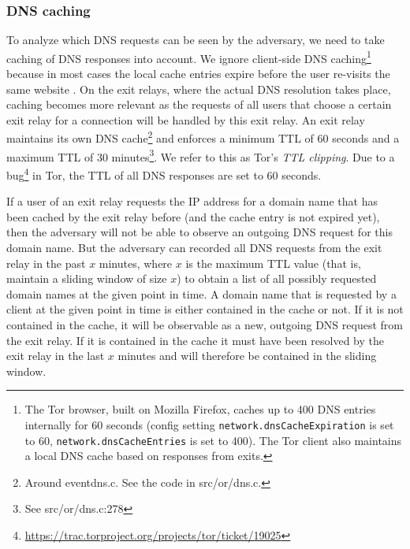 \subsubsection{DNS caching}
To analyze which DNS requests can be seen by the adversary, we need to
take caching of DNS responses into account. We ignore client-side DNS
caching\footnote{The Tor browser, built on Mozilla Firefox, caches up to
		400 DNS entries internally for 60 seconds (config setting
		\texttt{network.dnsCacheExpiration} is set to 60,
		\texttt{network.dnsCacheEntries} is set to 400). The Tor client
		also maintains a local DNS cache based on responses from exits.
			}
because in most cases the local cache entries expire before the user
re-visits the same website .
On the exit relays, where the actual DNS resolution takes place, caching
becomes more relevant as the requests of all users that choose a certain
exit relay for a connection will be handled by this exit relay. An exit
relay maintains its own DNS cache\footnote{Around eventdns.c.  See the
		code in src/or/dns.c.} and enforces a minimum TTL of 60 seconds
and a maximum TTL of 30 minutes\footnote{See src/or/dns.c:278}.  We
refer to this as Tor's \emph{TTL clipping}. Due to a
bug\footnote{\url{https://trac.torproject.org/projects/tor/ticket/19025}}
in Tor, the TTL of all DNS responses are set to 60 seconds.

If a user of an exit relay requests the IP address for a domain name
that has been cached by the exit relay before (and the cache entry is
not expired yet), then the adversary will not be able to observe an
outgoing DNS request for this domain name. But the adversary can
recorded all DNS requests from the exit relay in the past $x$ minutes,
where $x$ is the maximum TTL value (that is, maintain a sliding window of
size $x$) to obtain a list of all possibly requested domain names at the
given point in time. A domain name that is requested by a client at the
given point in time is either contained in the cache or not. If it is
not contained in the cache, it will be observable as a new, outgoing DNS
request from the exit relay. If it is contained in the cache it must
have been resolved by the exit relay in the last $x$ minutes and will
therefore be contained in the sliding window.


